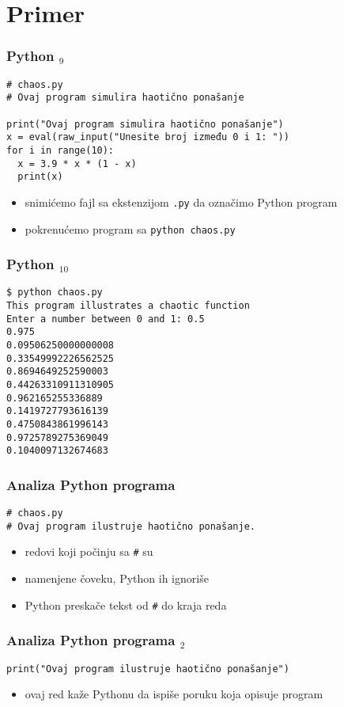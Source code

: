 \documentclass[utf8,compress]{beamer}
\begin{document}
\section{Primer}

\begin{frame}[fragile]
\frametitle{Python $_9$}
\begin{verbatim}
# chaos.py
# Ovaj program simulira haotično ponašanje

print("Ovaj program simulira haotično ponašanje")
x = eval(raw_input("Unesite broj između 0 i 1: "))
for i in range(10):
  x = 3.9 * x * (1 - x)
  print(x)
\end{verbatim}
\begin{itemize}
  \item snimićemo fajl sa ekstenzijom \texttt{.py} da označimo Python program
  \item pokrenućemo program sa \texttt{python chaos.py}
\end{itemize}
\end{frame}

\begin{frame}[fragile]
\frametitle{Python $_{10}$}
\begin{verbatim}
$ python chaos.py
This program illustrates a chaotic function
Enter a number between 0 and 1: 0.5
0.975
0.09506250000000008
0.33549992226562525
0.8694649252590003
0.44263310911310905
0.962165255336889
0.1419727793616139
0.4750843861996143
0.9725789275369049
0.1040097132674683
\end{verbatim}
\end{frame}

\begin{frame}[fragile]
\frametitle{Analiza Python programa}
\begin{verbatim}
# chaos.py
# Ovaj program ilustruje haotično ponašanje.
\end{verbatim}
\begin{itemize}
  \item redovi koji počinju sa \texttt{\#} su 
  \item namenjene čoveku, Python ih ignoriše
  \item Python preskače tekst od \texttt{\#} do kraja reda
\end{itemize}
\end{frame}

\begin{frame}[fragile]
\frametitle{Analiza Python programa $_2$}
\begin{verbatim}
print("Ovaj program ilustruje haotično ponašanje")
\end{verbatim}
\begin{itemize}
  \item ovaj red kaže Pythonu da ispiše poruku koja opisuje program
\end{itemize}
\end{frame}
\end{document}
